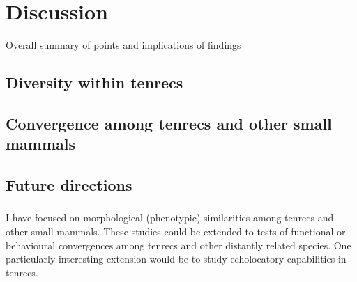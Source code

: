 \chapter{Discussion}
\label{chap:discussion}



\noindent
Overall summary of points and implications of findings

\section{Diversity within tenrecs}



\section{Convergence among tenrecs and other small mammals}



\section{Future directions}

\subsection{}

\subsection{}

\subsection{} 


\subsection{}

	I have focused on morphological (phenotypic) similarities among tenrecs and other small mammals. These studies could be extended to tests of functional or behavioural convergences among tenrecs and other distantly related species.
	One particularly interesting extension would be to study echolocatory capabilities in tenrecs.

